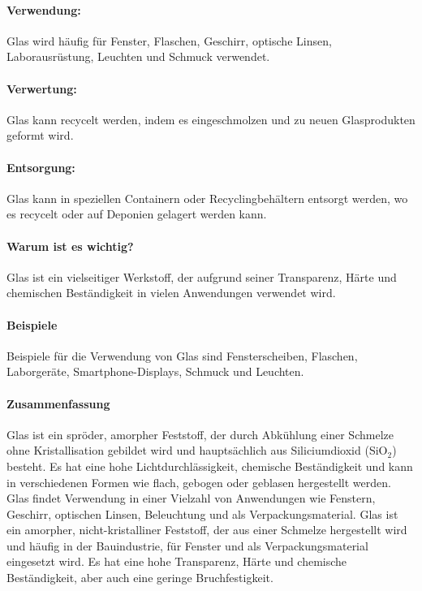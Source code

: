 \documentclass{article}
\begin{document}
\begin{multicols}{3}
\paragraph{Verwendung:}
Glas wird häufig für Fenster, Flaschen, Geschirr, optische Linsen,
Laborausrüstung, Leuchten und Schmuck verwendet.

\paragraph{Verwertung:}
Glas kann recycelt werden, indem es eingeschmolzen und zu neuen Glasprodukten
geformt wird.

\paragraph{Entsorgung:}
Glas kann in speziellen Containern oder Recyclingbehältern entsorgt werden, wo
es recycelt oder auf Deponien gelagert werden kann.

\paragraph{Warum ist es wichtig?}
Glas ist ein vielseitiger Werkstoff, der aufgrund seiner Transparenz, Härte und
chemischen Beständigkeit in vielen Anwendungen verwendet wird.

\paragraph{Beispiele}
Beispiele für die Verwendung von Glas sind Fensterscheiben, Flaschen,
Laborgeräte, Smartphone-Displays, Schmuck und Leuchten.

\paragraph{Zusammenfassung}
Glas ist ein spröder, amorpher Feststoff, der durch Abkühlung einer Schmelze
ohne Kristallisation gebildet wird und hauptsächlich aus Siliciumdioxid (SiO$_2$)
besteht. Es hat eine hohe Lichtdurchlässigkeit, chemische Beständigkeit und
kann in verschiedenen Formen wie flach, gebogen oder geblasen hergestellt
werden. Glas findet Verwendung in einer Vielzahl von Anwendungen wie Fenstern,
Geschirr, optischen Linsen, Beleuchtung und als Verpackungsmaterial.
Glas ist ein amorpher, nicht-kristalliner Feststoff, der aus einer Schmelze
hergestellt wird und häufig in der Bauindustrie, für Fenster und als
Verpackungsmaterial eingesetzt wird. Es hat eine hohe Transparenz, Härte und
chemische Beständigkeit, aber auch eine geringe Bruchfestigkeit.
\end{multicols}

\clearpage
\end{document}
